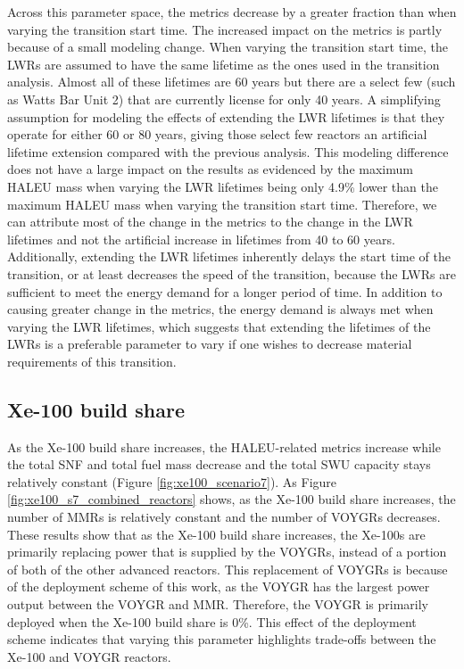 Across this parameter space, the metrics decrease by a greater fraction than 
when varying the transition start time. The increased impact on the metrics 
is partly because of a small modeling change. When varying the transition 
start time, the \glspl{LWR} are assumed to have the same lifetime as the 
ones used in the transition analysis. Almost all of these lifetimes are  
60 years but there are a select few (such as Watts Bar Unit 2) that 
are currently license for only 40 years. A simplifying assumption for 
modeling the effects of extending the \gls{LWR} lifetimes is that 
they operate for either 60 or 80 years, giving those select few reactors 
an artificial lifetime extension compared with the previous analysis. 
This modeling difference does not have a large impact on the results as 
evidenced by the maximum \gls{HALEU} mass when varying the \gls{LWR} lifetimes 
being only 4.9\% lower than the maximum \gls{HALEU} mass when varying the 
transition start time. Therefore, we can attribute most of the change in
the metrics to the 
change in the \gls{LWR} lifetimes and not the artificial increase in 
lifetimes from 40 to 60 years. Additionally, extending the \gls{LWR}
lifetimes inherently delays the start time of the transition, or at 
least decreases the speed of the transition, because the \glspl{LWR} 
are sufficient to meet the energy demand for a longer period of time.
In addition to causing greater change in the metrics, the energy demand 
is always met when varying the \gls{LWR} lifetimes, which suggests that 
extending the lifetimes of the \glspl{LWR} is a preferable parameter to vary 
if one wishes to decrease material requirements of this transition. 

\subsection{Xe-100 build share}
As the Xe-100 build share increases, the \gls{HALEU}-related metrics 
increase while the total \gls{SNF} and total fuel mass decrease and the 
total \gls{SWU} capacity stays relatively constant 
(Figure \ref{fig:xe100_scenario7}). As Figure \ref{fig:xe100_s7_combined_reactors} 
shows, as the Xe-100 build share 
increases, the number of \glspl{MMR} is relatively constant and the number of 
VOYGRs decreases. These results show that as the Xe-100 build share 
increases, the Xe-100s are primarily replacing power that is supplied by 
the VOYGRs, instead of a portion of both of the other advanced reactors.
This replacement of VOYGRs is because of the deployment scheme of this
work, as the VOYGR has the largest power output between the VOYGR and 
\gls{MMR}. Therefore, the VOYGR is primarily deployed when the Xe-100 
build share is 0\%. This effect of the deployment scheme indicates that 
varying this parameter highlights trade-offs between the Xe-100 and 
VOYGR reactors.


